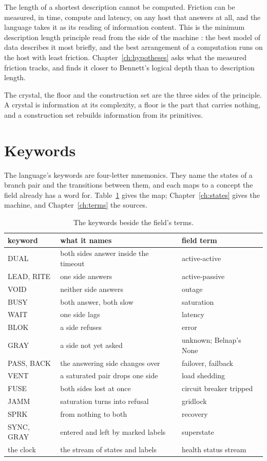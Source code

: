 The length of a shortest description cannot be computed. Friction can be measured, in time,
compute and latency, on any host that answers at all, and the language takes it as its reading of
information content. This is the minimum description length principle read from the side of the
machine \cite{src:Rissanen}: the best model of data describes it most briefly, and the best
arrangement of a computation runs on the host with least friction.
Chapter~\ref{ch:hypotheses} asks what the measured friction tracks, and finds it closer to
Bennett's logical depth \cite{src:Bennett} than to description length.

The crystal, the floor and the construction set are the three sides of the principle. A crystal
is information at its complexity, a floor is the part that carries nothing, and a construction set
rebuilds information from its primitives.

\section{Keywords}

The language's keywords are four-letter mnemonics. They name the states of a branch pair and the
transitions between them, and each maps to a concept the field already has a word for.
Table~\ref{tab:mnemonics} gives the map; Chapter~\ref{ch:states} gives the machine, and
Chapter~\ref{ch:terms} the sources.

\begin{table}[h]
\centering
\small
\begin{tabular}{@{}l l l@{}}
\toprule
keyword & what it names & field term \\
\midrule
DUAL & both sides answer inside the timeout & active-active \\
LEAD, RITE & one side answers & active-passive \\
VOID & neither side answers & outage \\
BUSY & both answer, both slow & saturation \\
WAIT & one side lags & latency \\
BLOK & a side refuses & error \\
GRAY & a side not yet asked & unknown; Belnap's None \\
PASS, BACK & the answering side changes over & failover, failback \\
VENT & a saturated pair drops one side & load shedding \\
FUSE & both sides lost at once & circuit breaker tripped \\
JAMM & saturation turns into refusal & gridlock \\
SPRK & from nothing to both & recovery \\
SYNC, GRAY & entered and left by marked labels & superstate \\
the clock & the stream of states and labels & health status stream \\
\bottomrule
\end{tabular}
\caption{The keywords beside the field's terms.}
\label{tab:mnemonics}
\end{table}
